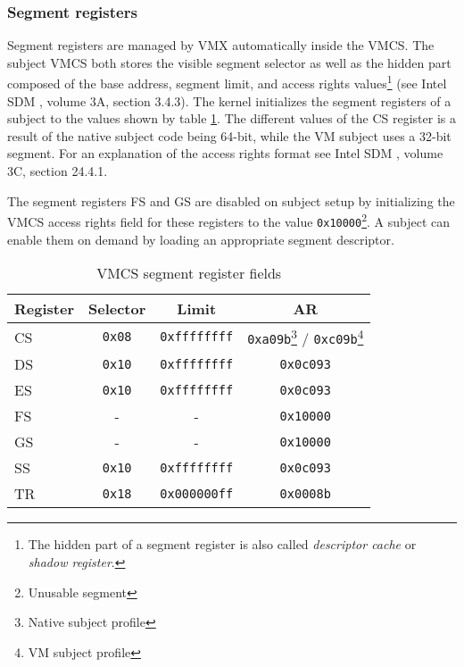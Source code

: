 \subsubsection{Segment registers}
Segment registers are managed by VMX automatically inside the VMCS. The subject
VMCS both stores the visible segment selector as well as
the hidden part composed of the base address, segment limit, and access rights
values\footnote{The hidden part of a segment register is also called
\emph{descriptor cache} or \emph{shadow register}.} (see Intel SDM
\cite{IntelSDM}, volume 3A, section 3.4.3). The kernel initializes the segment
registers of a subject to the values shown by table \ref{tab:vmcs-segment-regs}.
The different values of the CS register is a result of the native subject code
being 64-bit, while the VM subject uses a 32-bit segment. For an explanation of
the access rights format see Intel SDM \cite{IntelSDM}, volume 3C,
section 24.4.1.

The segment registers FS and GS are disabled on subject setup by initializing
the VMCS access rights field for these registers to the value
\texttt{0x10000}\footnote{Unusable segment}.  A subject can enable them on
demand by loading an appropriate segment descriptor.

\begin{table}[h]
	\centering
	\begin{minipage}[c]{8cm}
	\begin{tabular}{l|c|c|c}
		\textbf{Register} & \textbf{Selector} & \textbf{Limit} & \textbf{AR} \\
		\hline
		CS & \texttt{0x08} & \texttt{0xffffffff} &
		\texttt{0xa09b}\footnote{Native subject profile} /
		 \texttt{0xc09b}\footnote{VM subject profile} \\
		DS & \texttt{0x10} & \texttt{0xffffffff} & \texttt{0x0c093} \\
		ES & \texttt{0x10} & \texttt{0xffffffff} & \texttt{0x0c093} \\
		FS & -             & -                   & \texttt{0x10000} \\
		GS & -             & -                   & \texttt{0x10000} \\
		SS & \texttt{0x10} & \texttt{0xffffffff} & \texttt{0x0c093} \\
		TR & \texttt{0x18} & \texttt{0x000000ff} & \texttt{0x0008b} \\
	\end{tabular}
	\end{minipage}
	\caption{VMCS segment register fields}
	\label{tab:vmcs-segment-regs}
\end{table}

